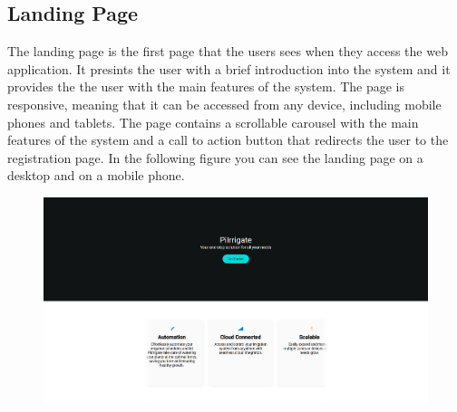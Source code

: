 \subsection{Landing Page}
The landing page is the first page that the users sees when they access the web application.
It presints the user with a brief introduction into the system and it provides the the user with the main 
features of the system. The page is responsive, meaning that it can be accessed from any device,
including mobile phones and tablets. The page contains a scrollable
carousel with the main features of the system and a call to action button that redirects the user to the registration page.
In the following figure you can see the landing page on a desktop and on a mobile phone. 
\begin{figure}[H]
    \centering
    \begin{minipage}{0.5\textwidth}
        \centering
        \includegraphics[width=\textwidth]{images/landing_page.png}
        \label{fig:landing-page-desktop}
    \end{minipage}\hfill
    \begin{minipage}{0.3\textwidth}
        \centering

\end{minipage}
\end{figure}
